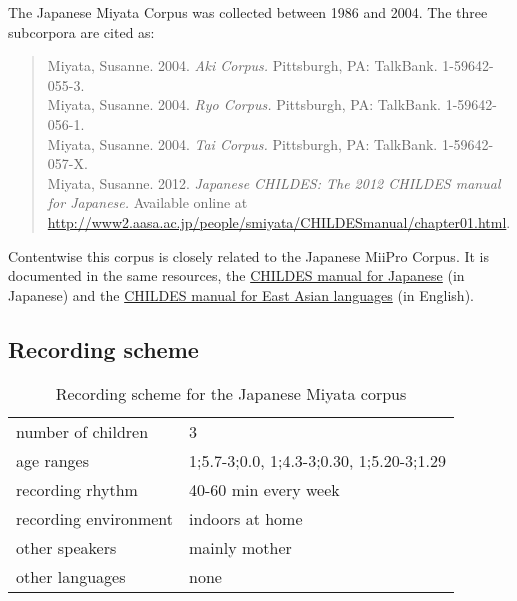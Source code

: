 \documentclass[a4paper, 11pt]{book}
\begin{document}
The Japanese Miyata Corpus \citep{Miyata2004a, Miyata2004b, Miyata2004c, Miyata2012a} was collected between 1986 and 2004. The three subcorpora are cited as:

\begin{quote}
	Miyata, Susanne. 2004. \emph{Aki Corpus.} Pittsburgh, PA: TalkBank. 1-59642-055-3. \\
	Miyata, Susanne. 2004. \emph{Ryo Corpus.} Pittsburgh, PA: TalkBank. 1-59642-056-1. \\
	Miyata, Susanne. 2004. \emph{Tai Corpus.} Pittsburgh, PA: TalkBank. 1-59642-057-X. \\
	Miyata, Susanne. 2012. \emph{Japanese CHILDES: The 2012 CHILDES manual for Japanese.} Available online at \url{http://www2.aasa.ac.jp/people/smiyata/CHILDESmanual/chapter01.html}.
\end{quote}

Contentwise this corpus is closely related to the Japanese MiiPro Corpus. It is documented in the same resources, the \href{http://www2.aasa.ac.jp/people/smiyata/CHILDESmanual/chapter01.html}{CHILDES manual for Japanese} (in Japanese) and the \href{http://childes.psy.cmu.edu/manuals/10eastasian.pdf}{CHILDES manual for East Asian languages} (in English). 


\subsection{Recording scheme}

\begin{table}[ht]
	\centering
	\begin{tabular}{ll}
		\toprule
		number of children 	& 3 \\
		age ranges 			& 1;5.7-3;0.0, 1;4.3-3;0.30, 1;5.20-3;1.29 \\
		recording rhythm 	& 40-60 min every week \\
		recording environment & indoors at home \\
		other speakers 		& mainly mother \\
		other languages		& none \\
		\bottomrule
	\end{tabular}
	\caption{Recording scheme for the Japanese Miyata corpus}
	\label{tab:Japanese Miyata recording scheme}
\end{table}
\end{document}
